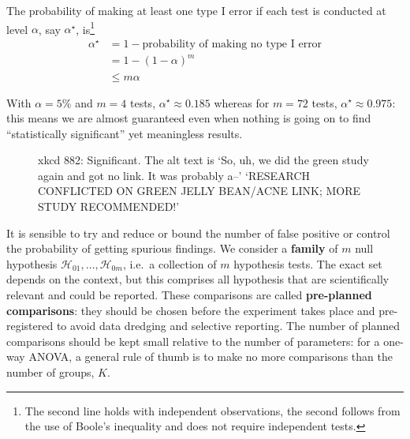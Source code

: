 \documentclass[
  11pt,
  letterpaper,
]{scrbook}
\theoremstyle{definition}
\theoremstyle{definition}
\theoremstyle{remark}
\begin{document}
The probability of making at least one type I error if each test is
conducted at level \(\alpha\), say \(\alpha^{\star}\), is\footnote{The
  second line holds with independent observations, the second follows
  from the use of Boole's inequality and does not require independent
  tests.} \begin{align}
\alpha^{\star} &= 1 - \text{probability of making no type I error} 
\\ &= 1- (1-\alpha)^m
\\ & \leq m\alpha
\end{align}

With \(\alpha = 5\)\% and \(m=4\) tests,
\(\alpha^{\star} \approx 0.185\) whereas for \(m=72\) tests,
\(\alpha^{\star} \approx 0.975\): this means we are almost guaranteed
even when nothing is going on to find ``statistically significant'' yet
meaningless results.

\begin{figure}[ht!]


\caption{\label{fig-xkcdsignificant}xkcd 882: Significant. The alt text
is `So, uh, we did the green study again and got no link. It was
probably a--' `RESEARCH CONFLICTED ON GREEN JELLY BEAN/ACNE LINK; MORE
STUDY RECOMMENDED!'}

\end{figure}%

It is sensible to try and reduce or bound the number of false positive
or control the probability of getting spurious findings. We consider a
\textbf{family} of \(m\) null hypothesis
\(\mathscr{H}_{01}, \ldots, \mathscr{H}_{0m}\), i.e.~a collection of
\(m\) hypothesis tests. The exact set depends on the context, but this
comprises all hypothesis that are scientifically relevant and could be
reported. These comparisons are called \textbf{pre-planned comparisons}:
they should be chosen before the experiment takes place and
pre-registered to avoid data dredging and selective reporting. The
number of planned comparisons should be kept small relative to the
number of parameters: for a one-way ANOVA, a general rule of thumb is to
make no more comparisons than the number of groups, \(K\).
\end{document}
